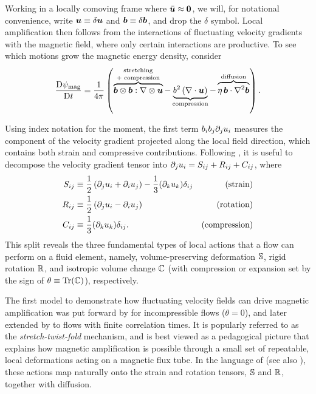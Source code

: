 Working in a locally comoving frame where $\bar{\bm{u}} \approx \bm{0}$, we will, for notational convenience, write $\bm{u} \equiv \delta\bm{u}$ and $\bm{b} \equiv \delta\bm{b}$, and drop the $\delta$ symbol. Local amplification  then follows from the interactions of fluctuating velocity gradients with the magnetic field, where only certain interactions are productive. To see which motions grow the magnetic energy density, consider
\begin{align}
    \mDDFrac{\psi_\mathrm{mag}}{t}
        = \frac{1}{4\pi} \rbrac{
                \overbrace{
                    \mVector{b}\otimes\mVector{b}:\nabla\otimes\mVector{u}
                }^\text{\shortstack{stretching\\ + compression}}
                - \underbrace{
                    b^2 \rbrac{\nabla\cdot\mVector{u}}
                }_\text{compression}
                - \overbrace{
                    \eta \,\mVector{b}\cdot\nabla^2\mVector{b}
                }^\text{diffusion}
            }
        \label{eqn:induction:lagrangian}
    .
\end{align}

Using index notation for the moment, the first term $ b_i b_j \partial _j u_i $ measures the component of the velocity gradient projected along the local field direction, which contains both strain and compressive contributions. Following \citet{beattie2023bulk}, it is useful to decompose the velocity gradient tensor into $\partial _j u_i = S_{ij} + R_{ij} + C_{ij}$, where
\begin{align}
    S_{ij}
        &\equiv \frac{1}{2} \left( \partial _j u_i + \partial _i u_j \right)
            - \frac{1}{3} (\partial _k u_k) \delta_{ij}
        & \mbox{(strain)} \\
    R_{ij}
        &\equiv \frac{1}{2} \left( \partial _j u_i - \partial _i u_j \right)
        & \mbox{(rotation)} \\
    C_{ij}
        &\equiv \frac{1}{3} (\partial _k u_k) \delta_{ij}
        . & \mbox{(compression)}
\end{align}
This split reveals the three fundamental types of local actions that a flow can perform on a fluid element, namely, volume-preserving deformation $\mathbb{S}$, rigid rotation $\mathbb{R}$, and isotropic volume change $\mathbb{C}$ (with compression or expansion set by the sign of $\theta \equiv \mathrm{Tr}(\mathbb{C})$), respectively.

The first model to demonstrate how fluctuating velocity fields can drive magnetic amplification was put forward by \citet{moffatt1961amplification} for incompressible flows ($\theta = 0$), and later extended by \citet{zel1984kinematic} to flows with finite correlation times. It is popularly referred to as the \textit{stretch-twist-fold} mechanism, and is best viewed as a pedagogical picture that explains how magnetic amplification is possible through a small set of repeatable, local deformations acting on a magnetic flux tube. In the language of \citet{beattie2023bulk} (see also \citealt{schekochihin2002spectra, seta2021saturation, sur2024role}), these actions map naturally onto the strain and rotation tensors, $\mathbb{S}$ and $\mathbb{R}$, together with diffusion.

